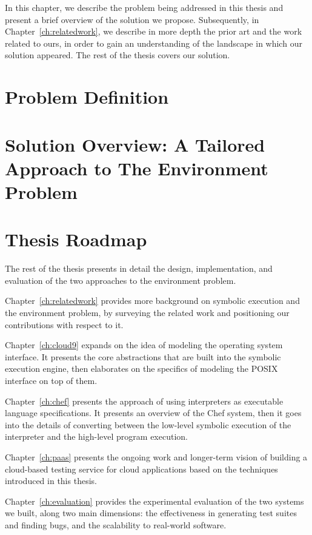In this chapter, we describe the problem being addressed in this thesis and present a brief overview of the solution we propose.
%
Subsequently, in Chapter~\ref{ch:relatedwork}, we describe in more depth the prior art and the work related to ours, in order to gain an understanding of the landscape in which our solution appeared.
%
The rest of the thesis covers our solution.

\section{Problem Definition}


\section{Solution Overview: A Tailored Approach to The Environment Problem}



\section{Thesis Roadmap}

The rest of the thesis presents in detail the design, implementation, and evaluation of the two approaches to the environment problem.

Chapter~\ref{ch:relatedwork} provides more background on symbolic execution and the environment problem, by surveying the related work and positioning our contributions with respect to it.

Chapter~\ref{ch:cloud9} expands on the idea of modeling the operating system interface.  It presents the core abstractions that are built into the symbolic execution engine, then elaborates on the specifics of modeling the POSIX interface on top of them.

Chapter~\ref{ch:chef} presents the approach of using interpreters as executable language specifications.  It presents an overview of the Chef system, then it goes into the details of converting between the low-level symbolic execution of the interpreter and the high-level program execution.

Chapter~\ref{ch:paas} presents the ongoing work and longer-term vision of building a cloud-based testing service for cloud applications based on the techniques introduced in this thesis.

Chapter~\ref{ch:evaluation} provides the experimental evaluation of the two systems we built, along two main dimensions: the effectiveness in generating test suites and finding bugs, and the scalability to real-world software.

